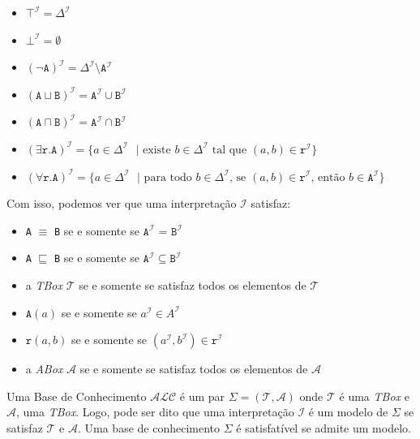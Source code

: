 \begin{itemize}
	\item $ \top^\mathcal{I} = \Delta^\mathcal{I} $
	\item $ \bot^\mathcal{I} = \emptyset $
	\item $ (\neg \texttt{A})^\mathcal{I} = \Delta^\mathcal{I} \setminus \texttt{A}^\mathcal{I}  $
	\item $(\texttt{A} \sqcup \texttt{B})^\mathcal{I} = \texttt{A}^\mathcal{I} \cup \texttt{B}^\mathcal{I}$  
	\item $(\texttt{A} \sqcap \texttt{B})^\mathcal{I} = \texttt{A}^\mathcal{I} \cap \texttt{B}^\mathcal{I}$
	\item $(\exists \texttt{r.A})^\mathcal{I} = \{a \in \Delta^\mathcal{I}\text{ }|\text{ existe } b \in \Delta^\mathcal{I} \text{ tal que } (a, b) \in \texttt{r}^\mathcal{I}\}$  
	\item $(\forall \texttt{r.A})^\mathcal{I} = \{a \in \Delta^\mathcal{I}\text{ }| \text{ para todo } b \in \Delta^\mathcal{I}\text{, se } (a, b) \in \texttt{r}^\mathcal{I}\text{, então } b \in \texttt{A}^\mathcal{I}\}$
\end{itemize}

Com isso, podemos ver que uma interpretação $ \mathcal{I} $ satisfaz:

\begin{multicols}{2}
	\begin{itemize}
		\item \texttt{A} $ \equiv $ \texttt{B} se e somente se $ \texttt{A}^\mathcal{I} $ = $ \texttt{B}^\mathcal{I} $ 
		\item \texttt{A} $ \sqsubseteq $ \texttt{B} se e somente se $ \texttt{A}^\mathcal{I} \subseteq \texttt{B}^\mathcal{I} $
		\item a \textit{TBox} $ \mathcal{T} $ se e somente se satisfaz todos os elementos de $ \mathcal{T} $
		\item $ \texttt{A}(a) $ se e somente se $ a^\mathcal{I} \in A^\mathcal{I} $
		\item $ \texttt{r}(a, b) $ se e somente se $ (a^\mathcal{I}, b^\mathcal{I}) \in \texttt{r}^\mathcal{I} $
		\item a \textit{ABox} $ \mathcal{A} $ se e somente se satisfaz todos os elementos de $ \mathcal{A} $
	\end{itemize}
\end{multicols}

Uma Base de Conhecimento $ \mathcal{ALC} $ é um par $ \Sigma = (\mathcal{T}, \mathcal{A}) $ onde $ \mathcal{T} $ é uma \textit{TBox} e $ \mathcal{A} $, uma \textit{TBox}. Logo, pode ser dito que uma interpretação $ \mathcal{I} $ é um modelo de $ \Sigma $ se satisfaz $ \mathcal{T} $ e $ \mathcal{A} $. Uma base de conhecimento $ \Sigma $ é satisfatível se admite um modelo.

